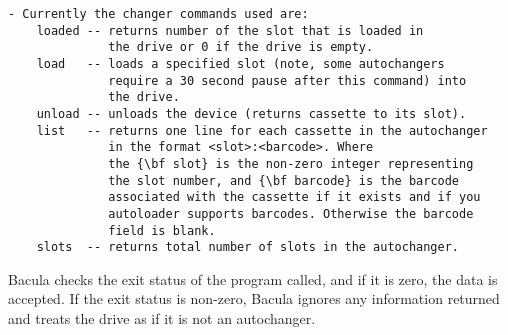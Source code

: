 \footnotesize
\begin{verbatim}
- Currently the changer commands used are:
    loaded -- returns number of the slot that is loaded in
              the drive or 0 if the drive is empty.
    load   -- loads a specified slot (note, some autochangers
              require a 30 second pause after this command) into
              the drive.
    unload -- unloads the device (returns cassette to its slot).
    list   -- returns one line for each cassette in the autochanger
              in the format <slot>:<barcode>. Where
              the {\bf slot} is the non-zero integer representing
              the slot number, and {\bf barcode} is the barcode
              associated with the cassette if it exists and if you
              autoloader supports barcodes. Otherwise the barcode
              field is blank.
    slots  -- returns total number of slots in the autochanger.
\end{verbatim}
\normalsize

Bacula checks the exit status of the program called, and if it is zero, the
data is accepted. If the exit status is non-zero, Bacula ignores any
information returned and treats the drive as if it is not an autochanger. 

